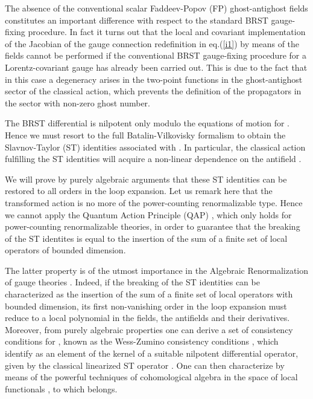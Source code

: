 \documentclass[a4paper,11pt]{article}
\begin{document}
The absence of the conventional scalar Faddeev-Popov (FP) 
ghost-anti\-ghost fields
constitutes an important difference with respect to the standard 
BRST gauge-fixing procedure. 
%
In fact 
it turns out that the local and covariant implementation 
of the Jacobian of the gauge connection redefinition in eq.(\ref{i1}) 
by means of the fields \coordHE{} cannot be performed
if the conventional BRST gauge-fixing procedure  for a Lorentz-covariant
gauge has already been carried out. This is due to the fact that 
in this case a degeneracy arises 
in the two-point functions in the ghost-antighost
sector of the classical action, which prevents the definition of the
propagators in the sector with non-zero ghost number.

The BRST differential 
\coordHE{} is nilpotent only modulo the equations of motion
for \coordHE{}. Hence we must resort to the full Batalin-Vilkovisky
\cite{gomis} formalism to obtain the Slavnov-Taylor (ST) identities
associated with \coordHE{}. In particular, the classical action
fulfilling the ST identities will acquire a non-linear dependence
on the antifield \coordHE{}.

We will prove 
by purely algebraic arguments 
that these ST identities can be restored
to all orders in the loop expansion.
Let us remark here that the transformed action is no more of the
power-counting renormalizable type.
Hence we cannot apply the 
Quantum Action Principle (QAP) \cite{qap1,qap2,qap3,qap4,Piguet:er}, 
which only holds for power-counting
renormalizable theories, in order to guarantee that 
the breaking of the ST identites is equal to the insertion
of the sum of a finite set of local operators of bounded dimension.

The latter property is of the utmost importance in 
the Algebraic Renormalization of gauge theories 
\cite{Piguet:er}. Indeed, if the breaking of the
ST identities can be characterized as the insertion of the sum of
a finite set
of local operators with bounded dimension, its first non-vanishing
order \coordHE{} in the loop expansion must reduce to a local polynomial
in the fields, the antifields and their derivatives. 
Moreover, from purely algebraic properties one can derive
a set of consistency conditions for \coordHE{}, known as 
the Wess-Zumino consistency conditions \cite{Piguet:er,Wess:yu},
which identify \coordHE{} as an element of the kernel
of a suitable nilpotent differential operator, given by
the classical linearized ST operator \cite{Piguet:er}.
One can then characterize \coordHE{} by means of the powerful
techniques of cohomological algebra 
in the space
of local functionals \cite{Piguet:er,Barnich:2000zw}, 
to which \coordHE{} belongs.
\end{document}
